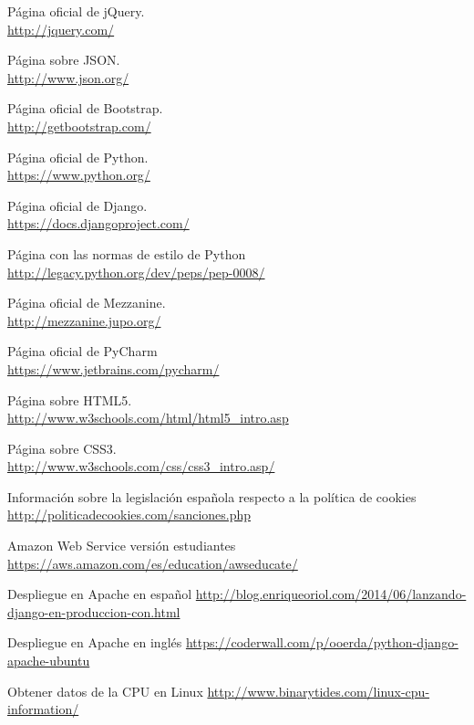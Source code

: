 
\cleardoublepage

\begin{thebibliography}{25}


 Página oficial de jQuery.    \\
{\footnotesize \url{http://jquery.com/}}

 Página sobre JSON.    \\
{\footnotesize
\url{http://www.json.org/}}


 Página oficial de Bootstrap.    \\
{\footnotesize
\url{http://getbootstrap.com/}}

 Página oficial de Python.     \\
{\footnotesize
\url{https://www.python.org/}}

 Página oficial de Django.      \\
{\footnotesize
\url{https://docs.djangoproject.com/}}

 Página con las normas de estilo de Python     \\
{\footnotesize
\url{http://legacy.python.org/dev/peps/pep-0008/}}

 Página oficial de Mezzanine.   \\
{\footnotesize
\url{http://mezzanine.jupo.org/}}

 Página oficial de PyCharm    \\
{\footnotesize
\url{https://www.jetbrains.com/pycharm/}}

 Página sobre HTML5.    \\
{\footnotesize
\url{http://www.w3schools.com/html/html5_intro.asp}}

 Página sobre CSS3.    \\
{\footnotesize
\url{http://www.w3schools.com/css/css3_intro.asp/ }}

 Información sobre la legislación española respecto a la política de cookies      \\
{\footnotesize
\url{http://politicadecookies.com/sanciones.php}}

Amazon Web Service versión estudiantes
{\footnotesize
\url{https://aws.amazon.com/es/education/awseducate/ }}

Despliegue en Apache en español 
{\footnotesize
\url{http://blog.enriqueoriol.com/2014/06/lanzando-django-en-produccion-con.html}}

Despliegue en Apache en inglés 
{\footnotesize
\url{https://coderwall.com/p/ooerda/python-django-apache-ubuntu}}

Obtener datos de la CPU en Linux
{\footnotesize
\url{http://www.binarytides.com/linux-cpu-information/}}

\end{thebibliography}